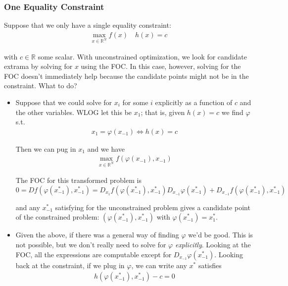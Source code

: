 \documentclass{article}
\begin{document}
\subsubsection{One Equality Constraint}
\label{ssub:one_equality_constraint}

Suppose that we only have a single equality constraint:
\begin{align*}
  \max_{x \in \mathbb{R}^N} f(x)
  \quad
  h(x) = c
\end{align*}

with $c \in \mathbb{R}$ some scalar. With unconstrained optimization, we look for candidate extrama by solving for $x$ using the FOC. In this case, however, solving for the FOC doesn't immediately help because the candidate points might not be in the constraint. What to do?
\begin{itemize}[label=$\bullet$]
  \item Suppose that we could solve for $x_i$ for some $i$ explicitly as a function of $c$ and the other variables. WLOG let this be $x_1$; that is, given $h(x) = c$ we find $\varphi$ s.t.
    \begin{align*}
      x_1 = \varphi(x_{-1})
      \iff
      h(x) = c
    \end{align*}

    Then we can pug in $x_1$ and we have
    \begin{align*}
      \max_{x \in \mathbb{R}^N} f(\varphi(x_{-1}), x_{-1})
    \end{align*}

    The FOC for this transformed problem is
    \begin{equation}
      \label{eq:lecture5_foc_lagrangian_exampe}
      0
      =
      D f(\varphi(x_{-1}^*), x_{-1}^*)
      =
      D_{x_1} f(\varphi(x_{-1}^*), x_{-1}^*) D_{x_{-1}} \varphi(x_{-1}^*)
      +
      D_{x_{-1}} f(\varphi(x_{-1}^*), x_{-1}^*)
    \end{equation}

    and any $x_{-1}^*$ satisfying  for the unconstrained problem gives a candidate point of the constrained problem: $(\varphi(x_{-1}^*), x_{-1}^*)$ with $\varphi(x_{-1}^*) = x_1^*$.

  \item Given the above, if there was a general way of finding $\varphi$ we'd be good. This is not possible, but we don't really need to solve for $\varphi$ \textit{explicitly}. Looking at the FOC, all the expressions are computable except for $D_{x_{-1}} \varphi(x_{-1}^*)$. Looking back at the constraint, if we plug in $\varphi$, we can write any $x^*$ satisfies
    \begin{align*}
      h(\varphi(x_{-1}^*), x_{-1}^*) - c = 0
    \end{align*}


\end{itemize}
\end{document}
